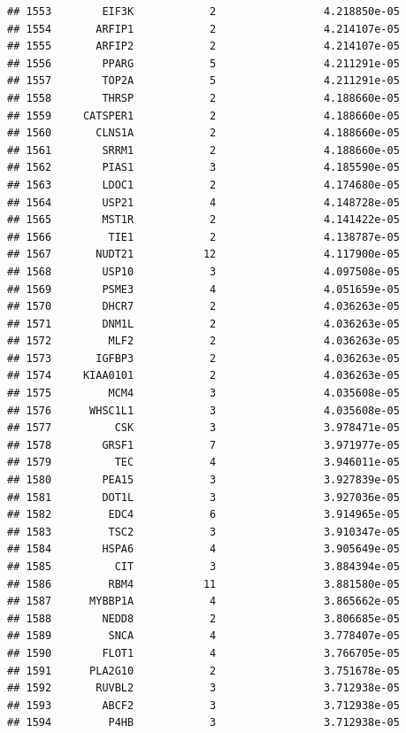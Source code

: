 \documentclass[
]{article}
\begin{document}
\begin{verbatim}
## 1553        EIF3K            2                 4.218850e-05
## 1554       ARFIP1            2                 4.214107e-05
## 1555       ARFIP2            2                 4.214107e-05
## 1556        PPARG            5                 4.211291e-05
## 1557        TOP2A            5                 4.211291e-05
## 1558        THRSP            2                 4.188660e-05
## 1559     CATSPER1            2                 4.188660e-05
## 1560       CLNS1A            2                 4.188660e-05
## 1561        SRRM1            2                 4.188660e-05
## 1562        PIAS1            3                 4.185590e-05
## 1563        LDOC1            2                 4.174680e-05
## 1564        USP21            4                 4.148728e-05
## 1565        MST1R            2                 4.141422e-05
## 1566         TIE1            2                 4.138787e-05
## 1567       NUDT21           12                 4.117900e-05
## 1568        USP10            3                 4.097508e-05
## 1569        PSME3            4                 4.051659e-05
## 1570        DHCR7            2                 4.036263e-05
## 1571        DNM1L            2                 4.036263e-05
## 1572         MLF2            2                 4.036263e-05
## 1573       IGFBP3            2                 4.036263e-05
## 1574     KIAA0101            2                 4.036263e-05
## 1575         MCM4            3                 4.035608e-05
## 1576      WHSC1L1            3                 4.035608e-05
## 1577          CSK            3                 3.978471e-05
## 1578        GRSF1            7                 3.971977e-05
## 1579          TEC            4                 3.946011e-05
## 1580        PEA15            3                 3.927839e-05
## 1581        DOT1L            3                 3.927036e-05
## 1582         EDC4            6                 3.914965e-05
## 1583         TSC2            3                 3.910347e-05
## 1584        HSPA6            4                 3.905649e-05
## 1585          CIT            3                 3.884394e-05
## 1586         RBM4           11                 3.881580e-05
## 1587      MYBBP1A            4                 3.865662e-05
## 1588        NEDD8            2                 3.806685e-05
## 1589         SNCA            4                 3.778407e-05
## 1590        FLOT1            4                 3.766705e-05
## 1591      PLA2G10            2                 3.751678e-05
## 1592       RUVBL2            3                 3.712938e-05
## 1593        ABCF2            3                 3.712938e-05
## 1594         P4HB            3                 3.712938e-05

\end{verbatim}
\end{document}
